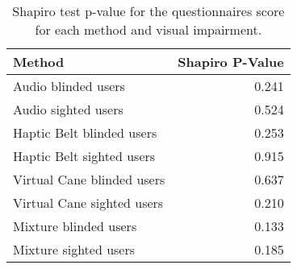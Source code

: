 
\begin{table}[!htb]
\centering
\caption{Shapiro test p-value for the questionnaires score for each method and visual impairment.}
\label{tab:shapiro_questionnaires}
\begin{tabular}{lr}
\toprule
                    Method &  Shapiro P-Value \\
\midrule
       Audio blinded users &            0.241 \\
       Audio sighted users &            0.524 \\
 Haptic Belt blinded users &            0.253 \\
 Haptic Belt sighted users &            0.915 \\
Virtual Cane blinded users &            0.637 \\
Virtual Cane sighted users &            0.210 \\
     Mixture blinded users &            0.133 \\
     Mixture sighted users &            0.185 \\
\bottomrule
\end{tabular}
\end{table}

